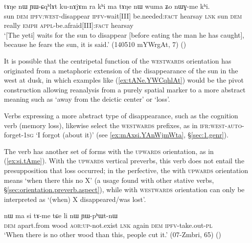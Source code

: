 \begin{exe}
\ex \label{ex:tANe.YWCqhlAt}
\gll  tɤŋe nɯ ɲɯ-ɕqʰlɤt ku-nɤjɤm ra kʰi ma tɤŋe nɯ wuma ʑo nɯɣ-me kʰi.  \\
sun \textsc{dem} \textsc{ipfv}:\textsc{west}-disappear \textsc{ipfv}-wait[III] be.needed:\textsc{fact} hearsay \textsc{lnk} sun \textsc{dem} really \textsc{emph} \textsc{appl}-be.afraid[III]:\textsc{fact} hearsay \\
\glt `[The yeti] waits for the sun to disappear [before eating the man he has caught], because he fears the sun, it is said.' (140510 mYWrgAt, 7)
()
\end{exe} 

It is possible that the centripetal function of the \textsc{westwards} orientation has originated from a metaphoric extension of the disappearance of the sun in the west at dusk, in which examples like (\ref{ex:tANe.YWCqhlAt}) would be the pivot construction allowing reanalysis from a purely spatial marker to a more abstract meaning such as `away from the deictic center' or `loss'.

Verbs expressing a more abstract type of disappearance, such as the cognition verb  (memory loss), likewise select the \textsc{westwards} prefixes, as in  \textsc{ifr}:\textsc{west}-\textsc{auto}-forget-\textsc{1sg} `I forgot (about it)' (see \ref{ex:mAxsi.YAnWjmWta}, §\ref{sec:1.genr}).

The verb  has another set of forms with the \textsc{upwards} orientation, as in (\ref{ex:si.tAme}). With the \textsc{upwards} vertical preverbs, this verb does not entail the presupposition that loss occurred; in the perfective, the  with \textsc{upwards} orientation means `when there this no X' (a usage found with other stative verbs, §\ref{sec:orientation.preverb.aspect}), while  with \textsc{westwards} orientation can only be interpreted as `(when) X disappeared/was lost'.

 \begin{exe}
\ex \label{ex:si.tAme}
\gll  nɯ ma si tɤ-me tɕe li nɯ ɲɯ-pʰɯt-nɯ\\
\textsc{dem} apart.from wood \textsc{aor}:\textsc{up}-not.exist \textsc{lnk} again \textsc{dem} \textsc{ipfv}-take.out-\textsc{pl}\\
\glt `When there is no other wood than this, people cut it.' (07-Zmbri, 65)
()
\end{exe} 

